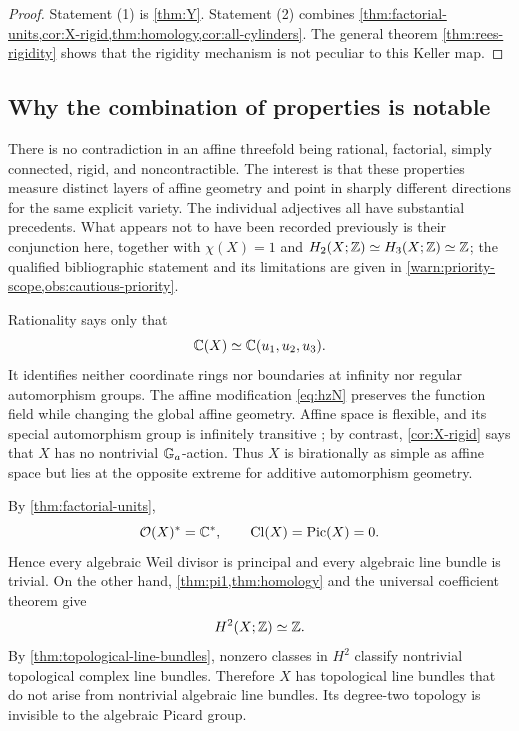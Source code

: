 \begin{proof}
Statement (1) is \cref{thm:Y}.  Statement (2) combines \cref{thm:factorial-units,cor:X-rigid,thm:homology,cor:all-cylinders}.  The general theorem \cref{thm:rees-rigidity} shows that the rigidity mechanism is not peculiar to this Keller map.
\end{proof}

\subsection{Why the combination of properties is notable}\label{subsec:why-notable}

\begin{observation}\label{obs:separation-layers}
There is no contradiction in an affine threefold being rational, factorial, simply connected, rigid, and noncontractible.  The interest is that these properties measure distinct layers of affine geometry and point in sharply different directions for the same explicit variety.  The individual adjectives all have substantial precedents.  What appears not to have been recorded previously is their conjunction here, together with $\chi(X)=1$ and $H_2(X;\mathbb Z)\simeq H_3(X;\mathbb Z)\simeq\mathbb Z$; the qualified bibliographic statement and its limitations are given in \cref{warn:priority-scope,obs:cautious-priority}.
\end{observation}

\begin{observation}\label{obs:birational-vs-additive}
Rationality says only that
\[
  \mathbb C(X)\simeq\mathbb C(u_1,u_2,u_3).
\]
It identifies neither coordinate rings nor boundaries at infinity nor regular automorphism groups.  The affine modification \eqref{eq:hzN} preserves the function field while changing the global affine geometry.  Affine space is flexible, and its special automorphism group is infinitely transitive \cite{ArzhantsevEtAl2013}; by contrast, \cref{cor:X-rigid} says that $X$ has no nontrivial $\mathbb G_a$-action.  Thus $X$ is birationally as simple as affine space but lies at the opposite extreme for additive automorphism geometry.
\end{observation}

\begin{observation}\label{obs:picard-vs-topology}
By \cref{thm:factorial-units},
\[
  \mathcal O(X)^*=\mathbb C^*,
  \qquad
  \operatorname{Cl}(X)=\operatorname{Pic}(X)=0.
\]
Hence every algebraic Weil divisor is principal and every algebraic line bundle is trivial.  On the other hand, \cref{thm:pi1,thm:homology} and the universal coefficient theorem give
\[
  H^2(X;\mathbb Z)\simeq\mathbb Z.
\]
By \cref{thm:topological-line-bundles}, nonzero classes in $H^2$ classify nontrivial topological complex line bundles.  Therefore $X$ has topological line bundles that do not arise from nontrivial algebraic line bundles.  Its degree-two topology is invisible to the algebraic Picard group.
\end{observation}

